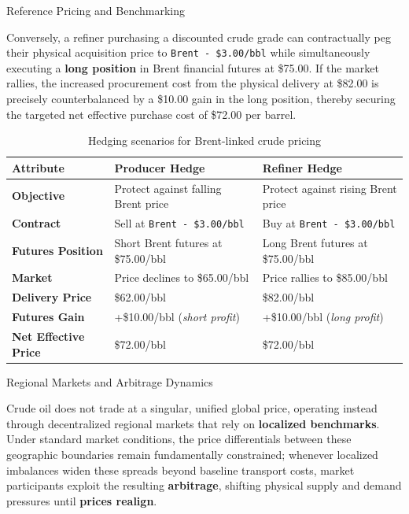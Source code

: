 \documentclass[10pt]{article}
\begin{document}
\begin{core}{Reference Pricing and Benchmarking}
\begin{enumerate}
        Conversely, a refiner purchasing a discounted crude grade can contractually peg their physical acquisition price to \texttt{Brent - \$3.00/bbl} while simultaneously executing a \textbf{long position} in Brent financial futures at \$75.00. If the market rallies, the increased procurement cost from the physical delivery at \$82.00 is precisely counterbalanced by a \$10.00 gain in the long position, thereby securing the targeted net effective purchase cost of \$72.00 per barrel.

      \end{enumerate}

      \begin{table}[H]
        \centering
        \renewcommand{\arraystretch}{1.4}
        \begin{tabular}{lp{5cm}p{5cm}}
          \hline
          \textbf{Attribute} & \textbf{Producer Hedge} & \textbf{Refiner Hedge} \\
          \hline
          \textbf{Objective} & Protect against falling Brent price & Protect against rising Brent price \\
          \textbf{Contract} & Sell at \texttt{Brent - \$3.00/bbl} & Buy at \texttt{Brent - \$3.00/bbl} \\
          \textbf{Futures Position} & Short Brent futures at \$75.00/bbl & Long Brent futures at \$75.00/bbl \\
          \textbf{Market} & Price declines to \$65.00/bbl & Price rallies to \$85.00/bbl \\
          \textbf{Delivery Price} & \$62.00/bbl & \$82.00/bbl \\
          \textbf{Futures Gain} & +\$10.00/bbl (\textit{short profit}) & +\$10.00/bbl (\textit{long profit}) \\
          \textbf{Net Effective Price} & \$72.00/bbl & \$72.00/bbl \\
          \hline
        \end{tabular}
        \caption{Hedging scenarios for Brent-linked crude pricing}
        \label{tab:hedging_scenarios}
      \end{table}

    \end{core}

    \begin{core}{Regional Markets and Arbitrage Dynamics}

      Crude oil does not trade at a singular, unified global price, operating instead through decentralized regional markets that rely on \textbf{localized benchmarks}. Under standard market conditions, the price differentials between these geographic boundaries remain fundamentally constrained; whenever localized imbalances widen these spreads beyond baseline transport costs, market participants exploit the resulting \textbf{arbitrage}, shifting physical supply and demand pressures until \textbf{prices realign}.

    \end{core}
\end{document}
